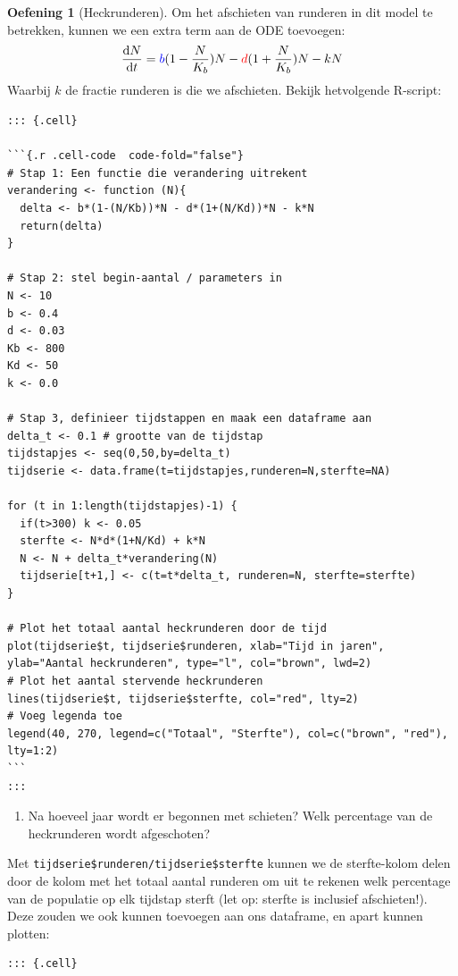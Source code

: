 \documentclass[
  a4paper,
]{scrbook}
\providecommand{\tightlist}{%
  \setlength{\itemsep}{0pt}\setlength{\parskip}{0pt}}\usepackage{longtable,booktabs,array}
\theoremstyle{definition}
\newtheorem{exercise}{Oefening}[chapter]
\theoremstyle{remark}
\begin{document}
\begin{exercise}[Heckrunderen]
Om het afschieten van runderen in dit model te betrekken, kunnen we een
extra term aan de ODE toevoegen: \[
      \frac{\mathrm{d}N}{\mathrm{d}t} = \color{blue}b\color{black}(1-\frac{N}{K_b})N - \color{red}d\color{black}(1+\frac{N}{K_b})N - kN
  \] Waarbij \(k\) de fractie runderen is die we afschieten. Bekijk
hetvolgende R-script:

\begin{verbatim}
::: {.cell}

```{.r .cell-code  code-fold="false"}
# Stap 1: Een functie die verandering uitrekent
verandering <- function (N){
  delta <- b*(1-(N/Kb))*N - d*(1+(N/Kd))*N - k*N
  return(delta)
}

# Stap 2: stel begin-aantal / parameters in
N <- 10
b <- 0.4    
d <- 0.03
Kb <- 800
Kd <- 50
k <- 0.0

# Stap 3, definieer tijdstappen en maak een dataframe aan
delta_t <- 0.1 # grootte van de tijdstap
tijdstapjes <- seq(0,50,by=delta_t)
tijdserie <- data.frame(t=tijdstapjes,runderen=N,sterfte=NA)

for (t in 1:length(tijdstapjes)-1) {
  if(t>300) k <- 0.05
  sterfte <- N*d*(1+N/Kd) + k*N
  N <- N + delta_t*verandering(N)
  tijdserie[t+1,] <- c(t=t*delta_t, runderen=N, sterfte=sterfte)
}

# Plot het totaal aantal heckrunderen door de tijd
plot(tijdserie$t, tijdserie$runderen, xlab="Tijd in jaren", ylab="Aantal heckrunderen", type="l", col="brown", lwd=2)
# Plot het aantal stervende heckrunderen
lines(tijdserie$t, tijdserie$sterfte, col="red", lty=2)
# Voeg legenda toe
legend(40, 270, legend=c("Totaal", "Sterfte"), col=c("brown", "red"), lty=1:2)
```
:::
\end{verbatim}

\begin{enumerate}
\def\labelenumi{\alph{enumi}.}
\setcounter{enumi}{5}
\tightlist
\item
  Na hoeveel jaar wordt er begonnen met schieten? Welk percentage van de
  heckrunderen wordt afgeschoten?
\end{enumerate}

Met \texttt{tijdserie\$runderen/tijdserie\$sterfte} kunnen we de
sterfte-kolom delen door de kolom met het totaal aantal runderen om uit
te rekenen welk percentage van de populatie op elk tijdstap sterft (let
op: sterfte is inclusief afschieten!). Deze zouden we ook kunnen
toevoegen aan ons dataframe, en apart kunnen plotten:

\begin{verbatim}
::: {.cell}


\end{verbatim}
\end{exercise}
\end{document}
